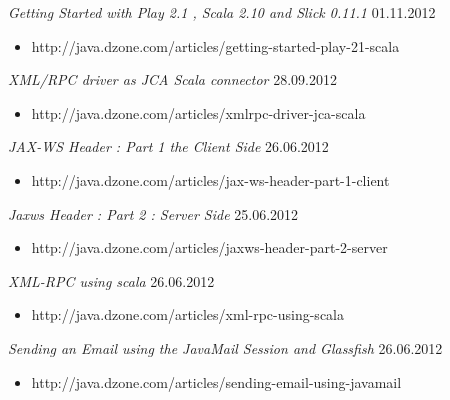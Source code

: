 \documentclass{res}
\begin{document}
\begin{resume}
{{\sl Getting Started with Play 2.1 , Scala 2.10 and Slick 0.11.1}  \hfill    01.11.2012	\\
\vspace{-5mm}  \begin{itemize}
\item[]  \scriptsize http://java.dzone.com/articles/getting-started-play-21-scala
\end{itemize}
\vspace{-2mm}

{\sl XML/RPC driver as JCA Scala connector}  \hfill    28.09.2012	\\
\vspace{-5mm}  \begin{itemize}
\item[]  \scriptsize http://java.dzone.com/articles/xmlrpc-driver-jca-scala
\end{itemize}
\vspace{-2mm}

{\sl JAX-WS Header : Part 1 the Client Side}  \hfill   26.06.2012	\\
\vspace{-5mm}  \begin{itemize}
\item[]  \scriptsize http://java.dzone.com/articles/jax-ws-header-part-1-client
\end{itemize}
\vspace{-2mm}

{\sl Jaxws Header : Part 2 : Server Side}  \hfill    25.06.2012	\\
\vspace{-5mm}  \begin{itemize}
\item[]  \scriptsize http://java.dzone.com/articles/jaxws-header-part-2-server
\end{itemize}
\vspace{-2mm}

{\sl XML-RPC using scala}  \hfill    26.06.2012	\\
\vspace{-5mm}  \begin{itemize}
\item[]  \scriptsize http://java.dzone.com/articles/xml-rpc-using-scala
\end{itemize}
\vspace{-2mm}

{\sl Sending an Email using the JavaMail Session and Glassfish}  \hfill    26.06.2012 \\
\vspace{-5mm}  \begin{itemize}
\item[]  \scriptsize http://java.dzone.com/articles/sending-email-using-javamail
\end{itemize}
\vspace{-2mm}

}
\end{resume}
\end{document}
